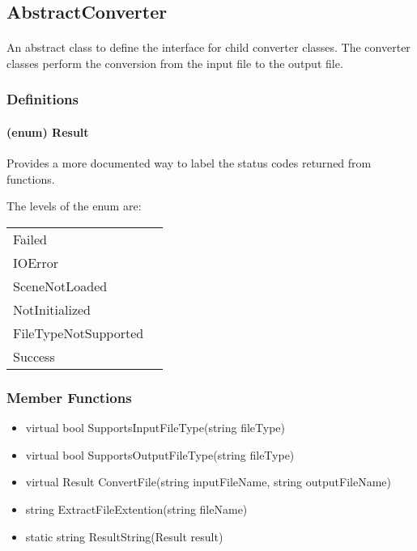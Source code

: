 \hypertarget{fileconversion_abstractconverter}
{
    \label{fileconversion_abstractconverter}
}

\subsection{AbstractConverter}
    \paragraph{}
        An abstract class to define the interface for child converter classes.  The converter classes perform the conversion from the input file to the output file.

    \subsubsection{Definitions}

    \paragraph{(enum) Result}
    Provides a more documented way to label the status codes returned from functions.

    The levels of the enum are:
    
    \begin{tabular}{l l}
        \centering
        Failed &\\
        IOError &\\
        SceneNotLoaded &\\
        NotInitialized &\\
        FileTypeNotSupported &\\
        Success &
    \end{tabular}
    
    \subsubsection{Member Functions}

        \begin{itemize}
            \item virtual bool SupportsInputFileType(string fileType)
            \item virtual bool SupportsOutputFileType(string fileType)
            \item virtual Result ConvertFile(string inputFileName, string outputFileName)
            \item string ExtractFileExtention(string fileName)
            \item static string ResultString(Result result)
        \end{itemize}

